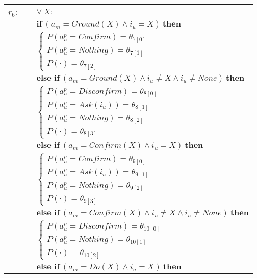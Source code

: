 \begin{small}
\begin{longtable}{p{1cm}p{14cm}}
$r_{6}$: \ \ & $\forall \ X: $ \\ & $\textbf{if} \ (\mathit{a_m}\!=\!\mathit{Ground({X})} \land \mathit{i_u}\!=\!\mathit{{X}}) \ \textbf{then} $ \\
 & \;\;\;\;\; $ \begin{cases}P(\mathit{a_u^p}\!=\!\mathit{Confirm})\!=\!\theta_{\mathrm{7[0]}} \\
P(\mathit{a_u^p}\!=\!\mathit{Nothing})\!=\!\theta_{\mathrm{7[1]}} \\
P(\cdot)\!=\!\theta_{\mathrm{7[2]}} \end{cases}$\\ & $ \textbf{else if} \ (\mathit{a_m}\!=\!\mathit{Ground({X})} \land \mathit{i_u}\!\neq\!\mathit{{X}} \land \mathit{i_u}\!\neq\!\mathit{None}) \ \textbf{then}$ \\
& \;\;\;\;\; $ \begin{cases}P(\mathit{a_u^p}\!=\!\mathit{Disconfirm})\!=\!\theta_{\mathrm{8[0]}} \\
P(\mathit{a_u^p}\!=\!\mathit{Ask({i_u})})\!=\!\theta_{\mathrm{8[1]}} \\
P(\mathit{a_u^p}\!=\!\mathit{Nothing})\!=\!\theta_{\mathrm{8[2]}} \\
P(\cdot)\!=\!\theta_{\mathrm{8[3]}} \end{cases}$\\ & $ \textbf{else if} \ (\mathit{a_m}\!=\!\mathit{Confirm({X})} \land \mathit{i_u}\!=\!\mathit{{X}}) \ \textbf{then}$ \\
& \;\;\;\;\; $ \begin{cases}P(\mathit{a_u^p}\!=\!\mathit{Confirm})\!=\!\theta_{\mathrm{9[0]}} \\
P(\mathit{a_u^p}\!=\!\mathit{Ask({i_u})})\!=\!\theta_{\mathrm{9[1]}} \\
P(\mathit{a_u^p}\!=\!\mathit{Nothing})\!=\!\theta_{\mathrm{9[2]}} \\
P(\cdot)\!=\!\theta_{\mathrm{9[3]}} \end{cases}$\\ & $ \textbf{else if} \ (\mathit{a_m}\!=\!\mathit{Confirm({X})} \land \mathit{i_u}\!\neq\!\mathit{{X}} \land \mathit{i_u}\!\neq\!\mathit{None}) \ \textbf{then}$ \\
& \;\;\;\;\; $ \begin{cases}P(\mathit{a_u^p}\!=\!\mathit{Disconfirm})\!=\!\theta_{\mathrm{10[0]}} \\
P(\mathit{a_u^p}\!=\!\mathit{Nothing})\!=\!\theta_{\mathrm{10[1]}} \\
P(\cdot)\!=\!\theta_{\mathrm{10[2]}} \end{cases}$\\ & $ \textbf{else if} \ (\mathit{a_m}\!=\!\mathit{Do({X})} \land \mathit{i_u}\!=\!\mathit{{X}}) \ \textbf{then}$ \\

\end{longtable}
\end{small}
